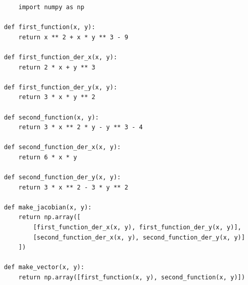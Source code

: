\documentclass[a4paper,12pt]{article}
\begin{document}
    \begin{lstlisting}
        import numpy as np
    
    def first_function(x, y):
        return x ** 2 + x * y ** 3 - 9 
            
    def first_function_der_x(x, y):
        return 2 * x + y ** 3 
    
    def first_function_der_y(x, y):
        return 3 * x * y ** 2
    
    def second_function(x, y):
        return 3 * x ** 2 * y - y ** 3 - 4
    
    def second_function_der_x(x, y):
        return 6 * x * y
    
    def second_function_der_y(x, y):
        return 3 * x ** 2 - 3 * y ** 2
    
    def make_jacobian(x, y):
        return np.array([
            [first_function_der_x(x, y), first_function_der_y(x, y)],
            [second_function_der_x(x, y), second_function_der_y(x, y)]
        ])
    
    def make_vector(x, y):
        return np.array([first_function(x, y), second_function(x, y)])
    

\end{lstlisting}
\end{document}
